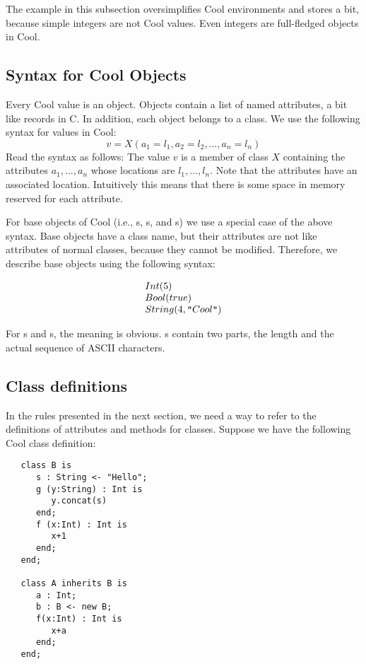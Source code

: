 The example in this subsection oversimplifies Cool environments and
stores a bit, because simple integers are not Cool values.
Even integers are full-fledged objects in Cool.


\subsection{Syntax for Cool Objects}
\label{objectsyntax}
Every Cool value is an object.
 Objects contain a list of
named attributes, a bit like records in C.  In addition, each object belongs to a class. We use
the following syntax for values in Cool:
\[
	v = X(a_1=l_1,a_2=l_2,\ldots,a_n=l_n)
\]
Read the syntax as follows: The value $v$ is a member of class $X$ containing the attributes
$a_1, \ldots, a_n$ whose locations are $l_1, \ldots, l_n$. Note that
the attributes have an associated location. Intuitively this means
that there is some space in memory reserved for each attribute.

For base objects of Cool (i.e., s, s, and s) we use a
special case of the above syntax. Base objects have a class
name, but their attributes are not like attributes of normal
classes, because they cannot be modified. Therefore, we describe
base objects using the following syntax:

\[
\begin{array}{l}
	Int(5)\\
	Bool(true)\\
	String(4,\mbox{\tt "} Cool \mbox{\tt "})
\end{array}
\]

For s and s, the meaning is obvious. s contain two
parts, the length and the actual sequence of ASCII characters.

\subsection{Class definitions}
\label{classdefs}
In the rules presented in the next section, we need a way to refer to
the definitions of attributes and methods for classes. 
Suppose we have the following Cool class
definition:
\begin{verbatim}
   class B is
      s : String <- "Hello";
      g (y:String) : Int is
         y.concat(s)
      end;
      f (x:Int) : Int is
         x+1
      end;
   end;

   class A inherits B is
      a : Int;
      b : B <- new B;
      f(x:Int) : Int is
         x+a
      end;
   end;
\end{verbatim}


